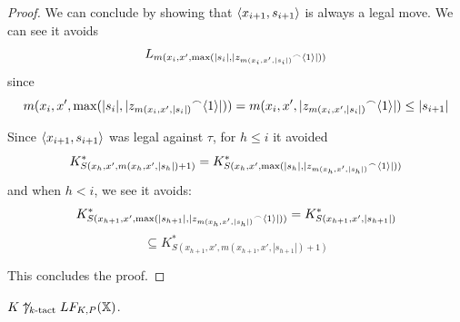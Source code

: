 \begin{proof}
We can conclude by showing that $\langle x_{i+1},s_{i+1}\rangle$ is always a legal move. We can see it avoids 
  \[
  L_{m(x_{i},x',\max(|s_{i}|,|{z_{m(x_i,x',|s_i|)}}^\frown\langle1\rangle|))}
  \]
since
  \[
    m(x_{i},x',\max(|s_{i}|,|{z_{m(x_i,x',|s_i|)}}^\frown\langle1\rangle|)) =
    m(x_{i},x',|{z_{m(x_i,x',|s_i|)}}^\frown\langle1\rangle|) \leq
    |s_{i+1}|
  \]

Since $\langle x_{i+1},s_{i+1}\rangle$ was legal against $\tau$, for $h\leq i$ it avoided
  \[
    K^*_{S(x_h,x',m(x_h,x',|s_h|)+1)} = 
    K^*_{S(x_h,x',\max(|s_h|,|{z_{m(x_h,x',|s_h|)}}^\frown\langle1\rangle|))}
  \]
and when $h<i$, we see it avoids:
  \[
    K^*_{S(x_{h+1},x',\max(|s_{h+1}|,|{z_{m(x_h,x',|s_h|)}}^\frown\langle1\rangle|))} =
    K^*_{S(x_{h+1},x',|s_{h+1}|)}
  \]
  \[
    \subseteq
    K^*_{S(x_{h+1},x',m(x_{h+1},x',|s_{h+1}|)+1)}
  \]

This concludes the proof.
\end{proof}

\newpage

\begin{theorem}
$K\not\uparrow_{k\text{-tact}}LF_{K,P}(\mathbb{X})$.
\end{theorem}

